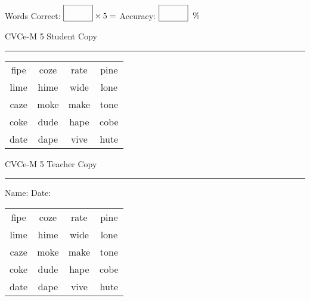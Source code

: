 \documentclass{memoir}
\begin{document}
\small

Words Correct: $\fbox{\phantom{\huge 100}} \times 5 = $ Accuracy: $\fbox{\phantom{\huge 100}}\;\; \%$ 

\vfill

\newpage


\footnotesize \noindent
CVCe-M 5 \hfill Student Copy
\smallskip
\hrule

\Large

\setlength{\tabcolsep}{14pt}
\def\arraystretch{2}

{\selectfont


\begin{vplace}[0.5]
\begin{center}
\begin{tabular}{cccc}
fipe & coze & rate & pine \\
lime & hime & wide & lone \\
caze & moke & make & tone \\
coke & dude & hape & cobe \\
date & dape & vive & hute \\
\end{tabular}
\end{center}
\end{vplace}

}

\newpage

\footnotesize \noindent
CVCe-M 5 \hfill Teacher Copy
\smallskip
\hrule

\small

\vfill

\noindent
Name: \underline{\hspace{1.75in}} \hfill Date: \underline{\hspace{1in}}

\Large

{\selectfont


\begin{vplace}[0.5]
\begin{center}
\begin{tabular}{cccc}
fipe & coze & rate & pine \\
lime & hime & wide & lone \\
caze & moke & make & tone \\
coke & dude & hape & cobe \\
date & dape & vive & hute \\
\end{tabular}
\end{center}
\end{vplace}



}
\end{document}
